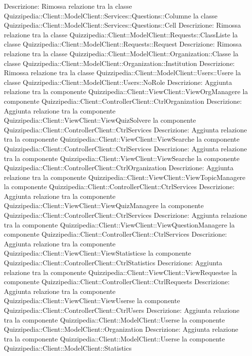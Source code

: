 Descrizione: Rimossa relazione tra la classe Quizzipedia::Client::ModelClient::Services::Questions::Columne la classe Quizzipedia::Client::ModelClient::Services::Questions::Cell 
Descrizione: Rimossa relazione tra la classe Quizzipedia::Client::ModelClient::Requests::ClassListe la classe Quizzipedia::Client::ModelClient::Requests::Request 
Descrizione: Rimossa relazione tra la classe Quizzipedia::Client::ModelClient::Organization::Classe la classe Quizzipedia::Client::ModelClient::Organization::Institution 
Descrizione: Rimossa relazione tra la classe Quizzipedia::Client::ModelClient::Users::Usere la classe Quizzipedia::Client::ModelClient::Users::NoRole 
Descrizione: Aggiunta relazione tra la componente Quizzipedia::Client::ViewClient::ViewOrgManagere la componente Quizzipedia::Client::ControllerClient::CtrlOrganization 
Descrizione: Aggiunta relazione tra la componente Quizzipedia::Client::ViewClient::ViewQuizSolvere la componente Quizzipedia::Client::ControllerClient::CtrlServices 
Descrizione: Aggiunta relazione tra la componente Quizzipedia::Client::ViewClient::ViewSearche la componente Quizzipedia::Client::ControllerClient::CtrlServices 
Descrizione: Aggiunta relazione tra la componente Quizzipedia::Client::ViewClient::ViewSearche la componente Quizzipedia::Client::ControllerClient::CtrlOrganization 
Descrizione: Aggiunta relazione tra la componente Quizzipedia::Client::ViewClient::ViewTopicManagere la componente Quizzipedia::Client::ControllerClient::CtrlServices 
Descrizione: Aggiunta relazione tra la componente Quizzipedia::Client::ViewClient::ViewQuizManagere la componente Quizzipedia::Client::ControllerClient::CtrlServices 
Descrizione: Aggiunta relazione tra la componente Quizzipedia::Client::ViewClient::ViewQuestionManagere la componente Quizzipedia::Client::ControllerClient::CtrlServices 
Descrizione: Aggiunta relazione tra la componente Quizzipedia::Client::ViewClient::ViewStatisticse la componente Quizzipedia::Client::ControllerClient::CtrlStatistics 
Descrizione: Aggiunta relazione tra la componente Quizzipedia::Client::ViewClient::ViewRequestse la componente Quizzipedia::Client::ControllerClient::CtrlRequests 
Descrizione: Aggiunta relazione tra la componente Quizzipedia::Client::ViewClient::ViewUserse la componente Quizzipedia::Client::ControllerClient::CtrlUsers 
Descrizione: Aggiunta relazione tra la componente Quizzipedia::Client::ModelClient::Userse la componente Quizzipedia::Client::ModelClient::Organization 
Descrizione: Aggiunta relazione tra la componente Quizzipedia::Client::ModelClient::Userse la componente Quizzipedia::Client::ModelClient::Statistics 
